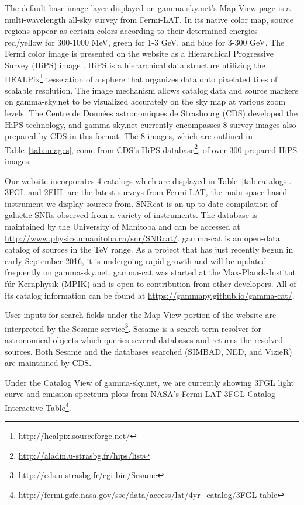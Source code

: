 





The default base image layer displayed on gamma-sky.net's Map View page is a multi-wavelength all-sky survey from Fermi-LAT. In its native color map, source regions appear as certain colors according to their determined energies - red/yellow for 300-1000 MeV, green for 1-3 GeV, and blue for 3-300 GeV. The Fermi color image is presented on the website as a Hierarchical Progressive Survey (HiPS) image \cite{hips}. HiPS is a hierarchical data structure utilizing the HEALPix\footnote[1]{\url{http://healpix.sourceforge.net/}} tesselation of a sphere that organizes data onto pixelated tiles of scalable resolution. The image mechanism allows catalog data and source markers on gamma-sky.net to be visualized accurately on the sky map at various zoom levels. The Centre de Donn\'{e}es astronomiques de Strasbourg (CDS) developed the HiPS technology, and gamma-sky.net currently encompasses 8 survey images also prepared by CDS in this format. The 8 images, which are outlined in Table~\ref{tab:images}, come from CDS's HiPS database\footnote[2]{\url{http://aladin.u-strasbg.fr/hips/list}}, of over 300 prepared HiPS images.

Our website incorporates 4 catalogs which are displayed in Table~\ref{tab:catalogs}. 3FGL \cite{3fgl} and 2FHL \cite{2fhl} are the latest surveys from Fermi-LAT, the main space-based instrument we display sources from. SNRcat \cite{snrcat} is an up-to-date compilation of galactic SNRs observed from a variety of instruments. The database is maintained by the University of Manitoba and can be accessed at \url{http://www.physics.umanitoba.ca/snr/SNRcat/}. gamma-cat is an open-data catalog of sources in the TeV range. As a project that has just recently begun in early September 2016, it is undergoing rapid growth and will be updated frequently on gamma-sky.net. gamma-cat was started at the Max-Planck-Institut f\'{u}r Kernphysik (MPIK) and is open to contribution from other developers. All of its catalog information can be found at \url{https://gammapy.github.io/gamma-cat/}.

User inputs for search fields under the Map View portion of the website are interpreted by the Sesame service\footnote[3]{\url{http://cds.u-strasbg.fr/cgi-bin/Sesame}}. Sesame is a search term resolver for astronomical objects which queries several databases and returns the resolved sources. Both Sesame and the databases searched (SIMBAD, NED, and VizieR) are maintained by CDS.

Under the Catalog View of gamma-sky.net, we are currently showing 3FGL light curve and emission spectrum plots from NASA's Fermi-LAT 3FGL Catalog Interactive Table\footnote[4]{\url{http://fermi.gsfc.nasa.gov/ssc/data/access/lat/4yr_catalog/3FGL-table}}.
